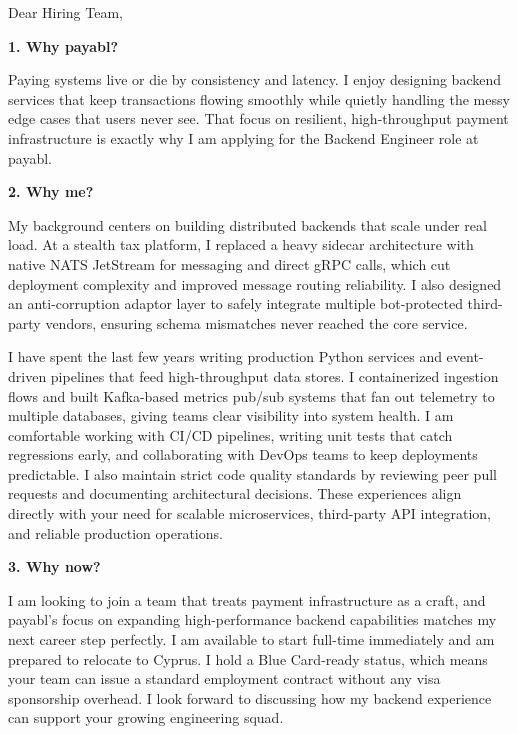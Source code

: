 \documentclass[11pt,a4paper]{coverletter}
\begin{document}

\opening{Dear Hiring Team,}

\vspace{8pt}\noindent\textbf{1. Why payabl?}\par\vspace{3pt}

Paying systems live or die by consistency and latency. I enjoy designing backend services that keep transactions flowing smoothly while quietly handling the messy edge cases that users never see. That focus on resilient, high-throughput payment infrastructure is exactly why I am applying for the Backend Engineer role at payabl.

\vspace{8pt}\noindent\textbf{2. Why me?}\par\vspace{3pt}

My background centers on building distributed backends that scale under real load. At a stealth tax platform, I replaced a heavy sidecar architecture with native NATS JetStream for messaging and direct gRPC calls, which cut deployment complexity and improved message routing reliability. I also designed an anti-corruption adaptor layer to safely integrate multiple bot-protected third-party vendors, ensuring schema mismatches never reached the core service.

I have spent the last few years writing production Python services and event-driven pipelines that feed high-throughput data stores. I containerized ingestion flows and built Kafka-based metrics pub/sub systems that fan out telemetry to multiple databases, giving teams clear visibility into system health. I am comfortable working with CI/CD pipelines, writing unit tests that catch regressions early, and collaborating with DevOps teams to keep deployments predictable. I also maintain strict code quality standards by reviewing peer pull requests and documenting architectural decisions. These experiences align directly with your need for scalable microservices, third-party API integration, and reliable production operations.

\vspace{8pt}\noindent\textbf{3. Why now?}\par\vspace{3pt}

I am looking to join a team that treats payment infrastructure as a craft, and payabl’s focus on expanding high-performance backend capabilities matches my next career step perfectly. I am available to start full-time immediately and am prepared to relocate to Cyprus. I hold a Blue Card-ready status, which means your team can issue a standard employment contract without any visa sponsorship overhead. I look forward to discussing how my backend experience can support your growing engineering squad.
\end{document}
